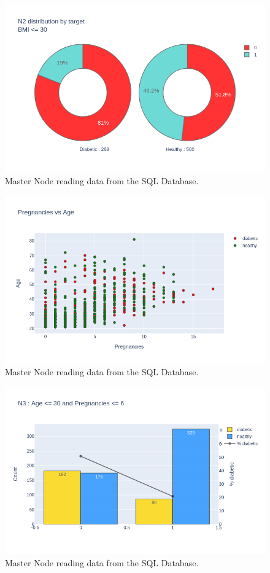 \documentclass[12pt]{article}
\begin{document}
\begin{figure}[ht]
\centering
\includegraphics[width=1\textwidth]{newplot(16).png}
\caption{Master Node reading data from the SQL Database.}
\end{figure}

\begin{figure}[ht]
\centering
\includegraphics[width=1\textwidth]{newplot(17).png}
\caption{Master Node reading data from the SQL Database.}
\end{figure}

\begin{figure}[ht]
\centering
\includegraphics[width=1\textwidth]{newplot(18).png}
\caption{Master Node reading data from the SQL Database.}
\end{figure}
\end{document}
